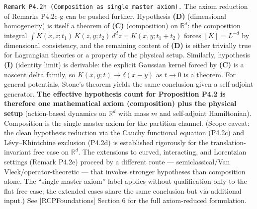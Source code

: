 \documentclass[
]{article}
\begin{document}
\texttt{Remark\ P4.2h\ (Composition\ as\ single\ master\ axiom).} The
axiom reduction of Remarks P4.2c-g can be pushed further. Hypothesis
\textbf{(D)} (dimensional homogeneity) is itself a theorem of
\textbf{(C)} (composition) on \(\mathbb{R}^d\): the composition integral
\(\int K(x,z;t_1)\,K(z,y;t_2)\,d^d z = K(x,y;t_1+t_2)\) forces
\([K]=L^{-d}\) by dimensional consistency, and the remaining content of
\textbf{(D)} is either trivially true for Lagrangian theories or a
property of the physical setup. Similarly, hypothesis \textbf{(I)}
(identity limit) is derivable: the explicit Gaussian kernel forced by
\textbf{(C)} is a nascent delta family, so \(K(x,y;t) \to \delta(x-y)\)
as \(t \to 0\) is a theorem. For general potentials, Stone's theorem
yields the same conclusion given a self-adjoint generator. \textbf{The
effective hypothesis count for Proposition P4.2 is therefore one
mathematical axiom (composition) plus the physical setup} (action-based
dynamics on \(\mathbb{R}^d\) with mass \(m\) and self-adjoint
Hamiltonian). Composition is the single master axiom for the partition
channel. (Scope caveat: the clean hypothesis reduction via the Cauchy
functional equation (P4.2c) and Lévy--Khintchine exclusion (P4.2d) is
established rigorously for the translation-invariant free case on
\(\mathbb{R}^d\). The extensions to curved, interacting, and Lorentzian
settings (Remark P4.2e) proceed by a different route ---
semiclassical/Van Vleck/operator-theoretic --- that invokes stronger
hypotheses than composition alone. The ``single master axiom'' label
applies without qualification only to the flat free case; the extended
cases share the same conclusion but via additional input.) See
{[}RCPFoundations{]} Section 6 for the full axiom-reduced formulation.
\end{document}
